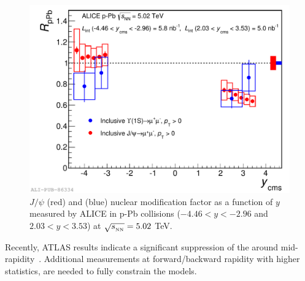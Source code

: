 \begin{figure}[!t]
\begin{center}
\includegraphics[width=0.8\linewidth]{Chapters/Analysis/Figs/2014-Oct-08-RpPb_Ups_Jpsi_b.pdf}
\caption{$J/\psi$ (red) and \upsis (blue) nuclear modification factor as a function of $y$ measured by ALICE in p-Pb collisions ($-4.46<y<-2.96$ and $2.03<y<3.53$) at $\sqrt{s_{_{\rm NN}}}=5.02$ \rm{TeV}.}
\label{fig:ALICE_pPb_jpsi_upsi}
\end{center}
\end{figure}

Recently, ATLAS results indicate a significant suppression of the \upsis around mid-rapidity~\cite{Aaboud:2017cif}.  
Additional measurements at forward/backward rapidity with higher statistics, are needed to fully constrain the models.

